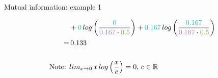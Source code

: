 \documentclass[11pt,compress,t,notes=noshow, aspectratio=169, xcolor=table]{beamer}
\begin{document}
\begin{frame}{Mutual information: example 1}
{\begin{align*}
    &+ \textcolor{summer}{0}\, log\left(\frac{\textcolor{summer}{0}}{\textcolor{fall}{0.167} \cdot \textcolor{spring}{0.5}} \right) 
    + \textcolor{summer}{0.167}\, log\left(\frac{\textcolor{summer}{0.167}}{\textcolor{fall}{0.167} \cdot \textcolor{spring}{0.5}} \right) \\
    = & \,0.133 \\
    &\quad \\
    \text{Note: } &lim_{x\rightarrow 0} \, x \, log\left(\frac{x}{c}\right) = 0, \, c \in \mathbb{R}
\end{align*}

}

\vspace{0.5cm}


\end{frame}
\end{document}
